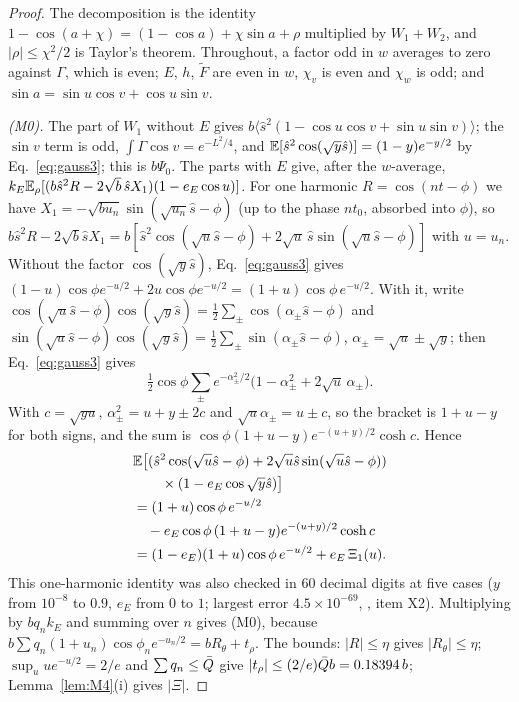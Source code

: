 \begin{proof}
The decomposition is the identity $1-\cos(a+\chi)=(1-\cos a)+\chi\sin a+\rho$ multiplied by $W_1+W_2$, and $|\rho|\le\chi^2/2$ is Taylor's theorem.
Throughout, a factor odd in $w$ averages to zero against $\Gamma$, which is even; $E$, $h$, $\tilde F$ are even in $w$, $\chi_v$ is even and $\chi_w$ is odd; and $\sin a=\sin u\cos v+\cos u\sin v$.

\emph{(M0).} The part of $W_1$ without $E$ gives $b\langle\hat s^2(1-\cos u\cos v+\sin u\sin v)\rangle$; the $\sin v$ term is odd, $\int\Gamma\cos v=e^{-L^2/4}$, and $\mathbb{E}[\hat s^2\cos(\sqrt y\hat s)]=(1-y)e^{-y/2}$ by Eq.~\eqref{eq:gauss3}; this is $b\Psi_0$.
The parts with $E$ give, after the $w$-average, $k_E\mathbb{E}_\rho[(b\hat s^2R-2\sqrt b\,\hat sX_1)(1-e_E\cos u)]$.
For one harmonic $R=\cos(nt-\phi)$ we have $X_1=-\sqrt{bu_n}\sin(\sqrt{u_n}\hat s-\phi)$ (up to the phase $nt_0$, absorbed into $\phi$), so $b\hat s^2R-2\sqrt b\hat sX_1=b[\hat s^2\cos(\sqrt u\hat s-\phi)+2\sqrt u\,\hat s\sin(\sqrt u\hat s-\phi)]$ with $u=u_n$.
Without the factor $\cos(\sqrt y\hat s)$, Eq.~\eqref{eq:gauss3} gives $(1-u)\cos\phi e^{-u/2}+2u\cos\phi e^{-u/2}=(1+u)\cos\phi\,e^{-u/2}$.
With it, write $\cos(\sqrt u\hat s-\phi)\cos(\sqrt y\hat s)=\frac12\sum_\pm\cos(\alpha_\pm\hat s-\phi)$ and $\sin(\sqrt u\hat s-\phi)\cos(\sqrt y\hat s)=\frac12\sum_\pm\sin(\alpha_\pm\hat s-\phi)$, $\alpha_\pm=\sqrt u\pm\sqrt y$; then Eq.~\eqref{eq:gauss3} gives
\begin{equation}
\tfrac12\cos\phi\sum_\pm e^{-\alpha_\pm^2/2}\bigl(1-\alpha_\pm^2+2\sqrt u\,\alpha_\pm\bigr).
\end{equation}
With $c=\sqrt{yu}$, $\alpha_\pm^2=u+y\pm2c$ and $\sqrt u\alpha_\pm=u\pm c$, so the bracket is $1+u-y$ for both signs, and the sum is $\cos\phi(1+u-y)e^{-(u+y)/2}\cosh c$.
Hence
\begin{equation}
\begin{split}
&\mathbb{E}\bigl[(\hat s^2\cos(\sqrt u\hat s-\phi)+2\sqrt u\hat s\sin(\sqrt u\hat s-\phi))\\&\qquad\times(1-e_E\cos\sqrt y\hat s)\bigr]\\
&=(1+u)\cos\phi\,e^{-u/2}\\&\quad-e_E\cos\phi\,(1+u-y)e^{-(u+y)/2}\cosh c\\
&=(1-e_E)(1+u)\cos\phi\,e^{-u/2}+e_E\,\Xi_1(u).
\end{split}
\label{eq:M0one}
\end{equation}
This one-harmonic identity was also checked in $60$ decimal digits at five cases ($y$ from $10^{-8}$ to $0.9$, $e_E$ from $0$ to $1$; largest error $4.5\times10^{-69}$, , item X2).
Multiplying by $bq_nk_E$ and summing over $n$ gives (M0), because $b\sum q_n(1+u_n)\cos\phi_ne^{-u_n/2}=bR_\theta+t_\rho$.
The bounds: $|R|\le\eta$ gives $|R_\theta|\le\eta$; $\sup_uue^{-u/2}=2/e$ and $\sum q_n\le\bar Q$ give $|t_\rho|\le(2/e)\bar Q b=0.18394\,b$; Lemma~\ref{lem:M4}(i) gives $|\Xi|$.


\end{proof}
